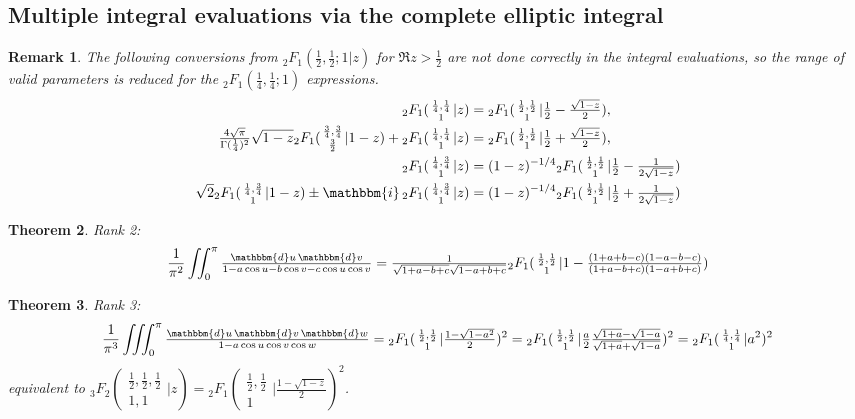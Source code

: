 \documentclass[12pt]{article}
\newcommand{\ii}[0] {\mathbbm{i}}
\newcommand{\dd}[0] {\mathbbm{d}}
\numberwithin{equation}{section}
\newtheorem{theorem}{Theorem}[section]
\newtheorem{remark}[theorem]{Remark}
\newcommand{\Head}[3] {{}_{#1}{#2}_{#3}}
\newcommand{\ArgS}[3] {( \begin{smallmatrix} #1 \\ #2 \end{smallmatrix} | {#3})}
\newcommand{\ArgKS}[1] {\ArgS{\frac12,\frac12}{1}{#1}}
\newcommand{\FFs}[6] {{}_{#1}{#2}_{#3} ( \begin{smallmatrix} #4 \\ #5 \end{smallmatrix} | {#6}  )}
\begin{document}
\subsection{Multiple integral evaluations via the complete elliptic integral}
\begin{remark}
The following conversions from $\Head{2}{F}{1}(\frac12, \frac12; 1 | z)$ for $\Re z > \frac12$ are not done correctly in the integral evaluations, so the range of valid parameters is reduced for the $\Head{2}{F}{1}(\frac14, \frac14; 1)$ expressions.
\begin{align*}
\FFs{2}{F}{1}{\frac14,\frac14}{1}{z} &= \Head{2}{F}{1} \ArgKS{\tfrac12 - \tfrac{\sqrt{1-z}}{2}}\text{,}\\
\tfrac{4\sqrt{\pi}}{\Gamma(\frac14)^2} \sqrt{1-z} \Head{2}{F}{1} \ArgS{\frac34,\frac34}{\frac32}{1-z} + \FFs{2}{F}{1}{\frac14,\frac14}{1}{z} &= \Head{2}{F}{1} \ArgKS{\tfrac12 + \tfrac{\sqrt{1-z}}{2}}\text{,}\\
\FFs{2}{F}{1}{\frac14,\frac34}{1}{z} &= (1-z)^{-1/4}\Head{2}{F}{1} \ArgKS{\tfrac12 - \tfrac{1}{2\sqrt{1-z}}}\\
\sqrt{2} \Head{2}{F}{1} \ArgS{\frac14,\frac34}{1}{1-z} \pm \ii \, \FFs{2}{F}{1}{\frac14,\frac34}{1}{z} &= (1-z)^{-1/4}\Head{2}{F}{1} \ArgKS{\tfrac12 + \tfrac{1}{2\sqrt{1-z}}}
\end{align*}
\end{remark}
\begin{theorem} Rank 2:
\begin{equation*}
\frac{1}{\pi^2} \iint_0^{\pi} \tfrac{\dd u \, \dd v} {1 - a \cos u - b \cos v - c \cos u \cos v} = \tfrac{1}{\sqrt{1+a-b+c}\sqrt{1-a+b+c}} \Head{2}{F}{1} \ArgKS{1-\tfrac{(1+a+b-c)(1-a-b-c)}{(1+a-b+c)(1-a+b+c)}}
\end{equation*}
\end{theorem}

\begin{theorem} Rank 3:
\begin{equation*}
\frac{1}{\pi^3} \iiint_0^{\pi} \tfrac{\dd u \, \dd v \, \dd w} {1 - a \cos u \cos v \cos w} = \Head{2}{F}{1} \ArgKS{\tfrac{1-\sqrt{1-a^2}}{2}}^2 = \Head{2}{F}{1} \ArgKS{\tfrac{a}{2}\tfrac{\sqrt{1+a}-\sqrt{1-a}}{\sqrt{1+a}+\sqrt{1-a}}}^2 = \Head{2}{F}{1} \ArgS{\frac14,\frac14}{1}{a^2}^2
\end{equation*}
equivalent to $\FFs{3}{F}{2}{\frac12,\frac12,\frac12}{1,1}{z} = \Head{2}{F}{1} \ArgKS{\tfrac{1 -\sqrt{1-z}}{2}}^2$.
\end{theorem}
\end{document}

